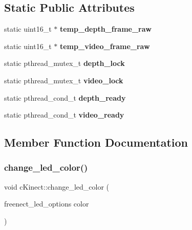 \subsection*{Static Public Attributes}
\begin{DoxyCompactItemize}
\item 
\mbox{\label{classc_kinect_acffdbc9763e84154378003559cd07f92}} 
static uint16\+\_\+t $\ast$ {\bfseries temp\+\_\+depth\+\_\+frame\+\_\+raw}
\item 
\mbox{\label{classc_kinect_a8ddb56f5ad81e7e06170ee457673c95e}} 
static uint16\+\_\+t $\ast$ {\bfseries temp\+\_\+video\+\_\+frame\+\_\+raw}
\item 
\mbox{\label{classc_kinect_a4f12a5bd20070b1171f5dd1d1bc0146b}} 
static pthread\+\_\+mutex\+\_\+t {\bfseries depth\+\_\+lock}
\item 
\mbox{\label{classc_kinect_a1f6310ddb6bc98ef46bf30e5efd9cfbc}} 
static pthread\+\_\+mutex\+\_\+t {\bfseries video\+\_\+lock}
\item 
\mbox{\label{classc_kinect_aebc0287dc3b472caf152731da48dc0b0}} 
static pthread\+\_\+cond\+\_\+t {\bfseries depth\+\_\+ready}
\item 
\mbox{\label{classc_kinect_a205923c6ab7dcb066e9ad87dd3d35559}} 
static pthread\+\_\+cond\+\_\+t {\bfseries video\+\_\+ready}
\end{DoxyCompactItemize}


\subsection{Member Function Documentation}
\mbox{\label{classc_kinect_a5bfa1f57240d21a5c6b3947d663cf39f}} 
\subsubsection{\texorpdfstring{change\+\_\+led\+\_\+color()}{change\_led\_color()}}
{\footnotesize\ttfamily void c\+Kinect\+::change\+\_\+led\+\_\+color (\begin{DoxyParamCaption}\item[{freenect\+\_\+led\+\_\+options}]{color }\end{DoxyParamCaption})}



